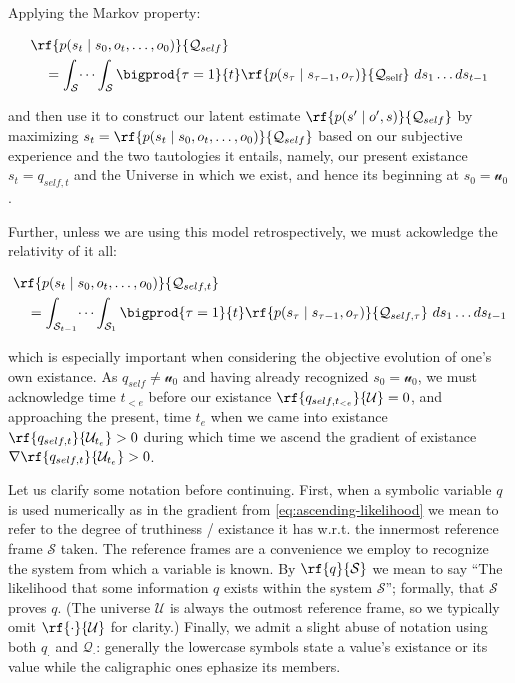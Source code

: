 Applying the Markov property:

\[
\begin{aligned}
    &\rf{p(s_t \mid s_0, o_t, \dots, o_0)}{\mathcal{Q}_{self}} \\
    &\quad = \int_{\mathcal{S}} \dots \int_{\mathcal{S}} 
        \bigprod{\tau=1}{t} 
            \rf{p(s_{\tau} \mid s_{\tau-1}, o_{\tau})}{\mathcal{Q}_{\text{self}}} \
            ds_1 \dots ds_{t-1}
\end{aligned}
\]


and then use it to construct our latent estimate $\rf{p(s' \mid o', s)}{\mathcal{Q}_{self}}$ by maximizing $s_t = \rf{p(s_t \mid s_0, o_t, \dots, o_0)}{\mathcal{Q}_{self}}$ based on our subjective experience and the two tautologies it entails, namely, our present existance $s_t = q_{self, t}$ and the Universe in which we exist, and hence its beginning at $s_0 = \mathcal{u}_0$. %

Further, unless we are using this model retrospectively, we must ackowledge the relativity of it all:

\[
\begin{aligned}
    &\rf{p(s_t \mid s_0, o_t, \dots, o_0)}{\mathcal{Q}_{self,t}} \\
    &\quad = \int_{\mathcal{S}_{t-1}} \dots \int_{\mathcal{S}_1} 
        \bigprod{\tau=1}{t} 
            \rf{p(s_{\tau} \mid s_{\tau-1}, o_{\tau})}{\mathcal{Q}_{self,\tau}} \
            ds_1 \dots ds_{t-1}
\end{aligned}
\]

which is especially important when considering the objective evolution of one's own existance. As $q_{self} \ne \mathcal{u}_0$ and having already recognized $s_0 = \mathcal{u}_0$, we must acknowledge time $t_{< e}$ before our existance $\rf{q_{self,t_{< e}}}{\mathcal{U}} = 0$, and approaching the present, time $t_e$ when we came into existance $\rf{q_{self,t}}{\mathcal{U}_{t_e}} > 0$ during which time we ascend the gradient of existance $\nabla \rf{q_{self,t}}{\mathcal{U}_{t_e}} > 0$.

\begin{shaded}
Let us clarify some notation before continuing. First, when a symbolic variable $q$ is used numerically as in the gradient from \ref{eq:ascending-likelihood} we mean to refer to the degree of truthiness / existance it has w.r.t. the innermost reference frame $\mathcal{S}$ taken. The reference frames are a convenience we employ to recognize the system from which a variable is known. By $\rf{q}{\mathcal{S}}$ we mean to say ``The likelihood that some information $q$ exists within the system $\mathcal{S}$''; formally, that $\mathcal{S}$ proves $q$. (The universe $\mathcal{U}$ is always the outmost reference frame, so we typically omit $\rf{\cdot}{\mathcal{U}}$ for clarity.) Finally, we admit a slight abuse of notation using both $q_{\cdot}$ and $\mathcal{Q}_{\cdot}$: generally the lowercase symbols state a value's existance or its value while the caligraphic ones ephasize its members.
\end{shaded}


